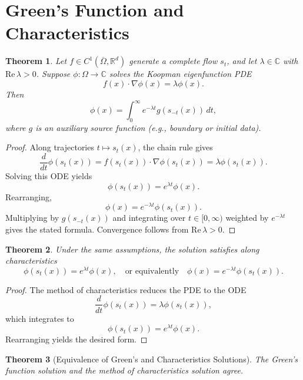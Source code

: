 \documentclass[11pt]{article}
\theoremstyle{plain}
\newtheorem{theorem}{Theorem}[section]
\def\[{\begin{equation}}
\def\]{\end{equation}}
\begin{document}

\section{Green's Function and Characteristics} \label{sect:C}

\begin{theorem}
\label{thm:GreenFunctionSolution}
Let $f\in C^1(\overline{\Omega},\mathbb{R}^d)$ generate a complete flow $s_t$, and let $\lambda\in\mathbb{C}$ with $\mathrm{Re}\,\lambda>0$. 
Suppose $\phi:\Omega \to\mathbb{C}$ solves the Koopman eigenfunction PDE
\[
f(x)\cdot\nabla\phi(x) = \lambda \phi(x).
\]
Then
\[
\phi(x) = \int_0^\infty e^{-\lambda t} g(s_{-t}(x))\,dt,
\]
where $g$ is an auxiliary source function (e.g., boundary or initial data).
\end{theorem}

\begin{proof}
Along trajectories $t\mapsto s_t(x)$, the chain rule gives
\[
\frac{d}{dt}\phi(s_t(x)) = f(s_t(x))\cdot\nabla\phi(s_t(x)) = \lambda\phi(s_t(x)).
\]
Solving this ODE yields
\[
\phi(s_t(x)) = e^{\lambda t} \phi(x).
\]
Rearranging,
\[
\phi(x) = e^{-\lambda t} \phi(s_t(x)).
\]
Multiplying by $g(s_{-t}(x))$ and integrating over $t\in[0,\infty)$ weighted by $e^{-\lambda t}$ gives the stated formula. Convergence follows from $\mathrm{Re}\,\lambda>0$. 
\end{proof}

\begin{theorem}
\label{thm:CharacteristicsSolution}
Under the same assumptions, the solution satisfies along characteristics
\[
\phi(s_t(x)) = e^{\lambda t} \phi(x),
\quad\text{or equivalently}\quad
\phi(x) = e^{-\lambda t} \phi(s_t(x)).
\]
\end{theorem}

\begin{proof}
The method of characteristics reduces the PDE to the ODE
\[
\frac{d}{dt}\phi(s_t(x)) = \lambda\phi(s_t(x)),
\]
which integrates to
\[
\phi(s_t(x)) = e^{\lambda t}\phi(x).
\]
Rearranging yields the desired form. 
\end{proof}

\begin{theorem}[Equivalence of Green's and Characteristics Solutions]
\label{thm:GreenCharacteristicsEquivalence}
The Green's function solution and the method of characteristics solution agree.
\end{theorem}
\end{document}
